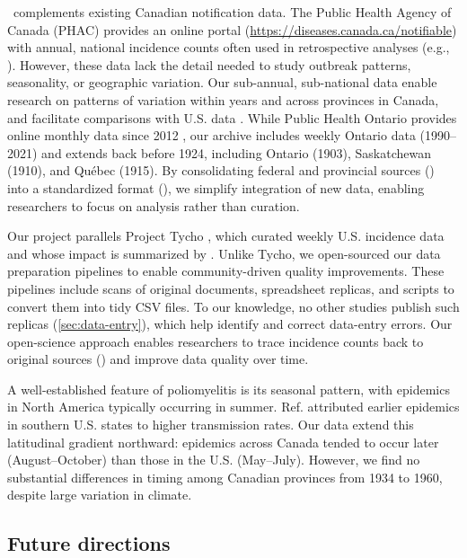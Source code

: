 \documentclass[12pt]{article}
\begin{document}
\datacronym\ complements existing Canadian notification data. The Public Health Agency of Canada (PHAC) provides an online portal \cite{totten2019updates} (\url{https://diseases.canada.ca/notifiable}) with annual, national incidence counts often used in retrospective analyses (e.g., \cite{payne2014hepatitis,gasmi2017emerging,lin2021relaying,lin2021influenza,thommes2020revisiting,golden2024ccdr}). However, these data lack the detail needed to study outbreak patterns, seasonality, or geographic variation. Our sub-annual, sub-national data enable research on patterns of variation within years and across provinces in Canada, and facilitate comparisons with U.S. data \cite{van2018project}. While Public Health Ontario provides online monthly data since 2012 \cite{phoquery}, our archive includes weekly Ontario data (1990--2021) and extends back before 1924, including Ontario (1903), Saskatchewan (1910), and Québec (1915). By consolidating federal and provincial sources () into a standardized format (), we simplify integration of new data, enabling researchers to focus on analysis rather than curation.

Our project parallels Project Tycho \cite{van2013contagious}, which curated weekly U.S. incidence data and whose impact is summarized by \cite{van2018project}. Unlike Tycho, we open-sourced our data preparation pipelines to enable community-driven quality improvements. These pipelines include scans of original documents, spreadsheet replicas, and scripts to convert them into tidy CSV files. To our knowledge, no other studies publish such replicas (\cref{sec:data-entry}), which help identify and correct data-entry errors. Our open-science approach enables researchers to trace incidence counts back to original sources () and improve data quality over time.

A well-established feature of poliomyelitis is its seasonal pattern, with epidemics in North America typically occurring in summer. Ref. \cite{martinez2015unraveling} attributed earlier epidemics in southern U.S. states to higher transmission rates. Our data extend this latitudinal gradient northward: epidemics across Canada tended to occur later (August--October) than those in the U.S. (May--July). However, we find no substantial differences in timing among Canadian provinces from 1934 to 1960, despite large variation in climate.

\subsection{Future directions}\label{sec:future}
\end{document}

